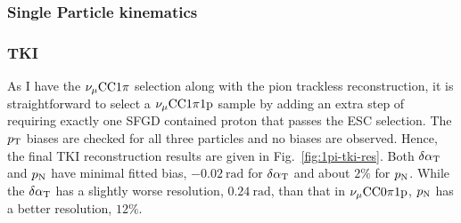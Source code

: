      \subsubsection{Single Particle kinematics}


     \subsubsection{TKI}
     As I have the $\nu_{\mu}\textrm{CC}1\pi$ selection along with the pion trackless reconstruction, it is straightforward to select a $\nu_{\mu}\textrm{CC}1\pi1\textrm{p}$ sample by adding an extra step of requiring exactly one SFGD contained proton that passes the ESC selection. 
     The $p_\textrm{T}$ biases are checked for all three particles and no biases are observed. Hence, the final TKI reconstruction results are given in Fig.~\ref{fig:1pi-tki-res}. Both $\delta\alpha_\textrm{T}$ and $p_\textrm{N}$ have minimal fitted bias, $-0.02~\textrm{rad}$ for $\delta\alpha_\textrm{T}$ and about $2\%$ for $p_\textrm{N}$. While the $\delta\alpha_\textrm{T}$ has a slightly worse resolution, $0.24~\textrm{rad}$, than that in $\nu_{\mu}\textrm{CC}0\pi1\textrm{p}$, $p_\textrm{N}$ has a better resolution, $12\%$. 
     

